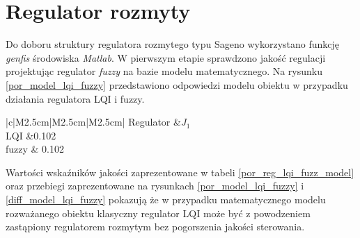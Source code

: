 \section{Regulator rozmyty}
Do doboru struktury regulatora rozmytego typu Sageno wykorzystano funkcję \textit{genfis} środowiska \textit{Matlab}. W pierwszym etapie sprawdzono jakość regulacji projektując regulator \textit{fuzzy} na bazie modelu matematycznego. Na rysunku  \ref{por_model_lqi_fuzzy} przedstawiono odpowiedzi modelu obiektu w przypadku działania regulatora LQI i fuzzy.\\
%
\begin{table}[h]
	\caption{Porównanie wska\'zników jakości regulator LQI i fuzzy dla modelu.}
	\label{por_reg_lqi_fuzz_model}
	\centering
	
	\begin{tabular}{|c|M{2.5cm}|M{2.5cm}|M{2.5cm}|}
		\hline
		Regulator &$J_1$\\
		\hline
		LQI &0.102\\
		\hline
		fuzzy & 0.102\\
		\hline
	\end{tabular}
\end{table}
\FloatBarrier
Wartości wska\'zników jakości zaprezentowane w tabeli \ref{por_reg_lqi_fuzz_model} oraz przebiegi zaprezentowane na rysunkach \ref{por_model_lqi_fuzzy} i \ref{diff_model_lqi_fuzzy} pokazują że w przypadku matematycznego modelu rozważanego obiektu klasyczny regulator LQI może być z powodzeniem zastąpiony regulatorem rozmytym bez pogorszenia jakości sterowania.

